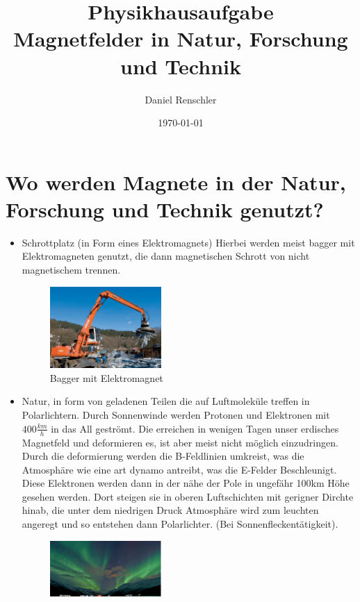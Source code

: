\documentclass[a4paper]{report}
\begin{document}
\title{\Huge{Physikhausaufgabe}\\Magnetfelder in Natur, Forschung und Technik}
\author{\huge{Daniel Renschler}}
\date{\today}
\maketitle

\section*{Wo werden Magnete in der Natur, Forschung und Technik genutzt?}
    \begin{itemize}
        \item Schrottplatz (in Form eines Elektromagnets)
            Hierbei werden meist bagger mit Elektromagneten genutzt, die dann magnetischen Schrott von nicht magnetischem trennen.
            \begin{figure}[htpb]
                \centering
                \includegraphics[width=0.4\textwidth]{Bagger.jpeg}
                \caption{Bagger mit Elektromagnet}
                \label{fig:Bagger}
            \end{figure}
        \item Natur, in form von geladenen Teilen die auf Luftmoleküle treffen in Polarlichtern.
            Durch Sonnenwinde werden Protonen und Elektronen mit $400 \frac{km}{h}$ in das All geströmt. Die erreichen in wenigen Tagen unser erdisches Magnetfeld und deformieren es, ist aber meist nicht möglich einzudringen. Durch die deformierung werden die B-Feldlinien umkreist, was die Atmosphäre wie eine art dynamo antreibt, was die E-Felder Beschleunigt. Diese Elektronen werden dann in der nähe der Pole in ungefähr 100km Höhe gesehen werden. Dort steigen sie in oberen Luftschichten mit gerigner Dirchte hinab, die unter dem niedrigen Druck Atmosphäre wird zum leuchten angeregt und so entstehen dann Polarlichter. (Bei Sonnenfleckentätigkeit).
            \begin{figure}[htpb]
                \centering
                \includegraphics[width=0.4\textwidth]{Polarlicht.jpeg}

\end{figure}
\end{itemize}
\end{document}
